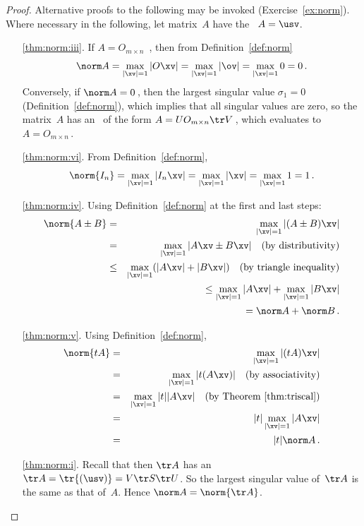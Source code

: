 \begin{proof}  Alternative proofs to the following may be invoked (Exercise~\ref{ex:norm}).
Where necessary in the following, let matrix~\(A\) have the \svd\ \(A=\usv\).
\begin{itemize}
\item[\ref{thm:norm:iii}.]
If \(A=O_{m\times n}\) \,,
then from Definition~\ref{def:norm} 
\begin{equation*}
\norm A=\max_{|\xv|=1}|O\xv|
=\max_{|\xv|=1}|\ov|=\max_{|\xv|=1}0=0\,.
\end{equation*}
Conversely, if \(\norm A=0\)\,, then the largest singular value \(\sigma_1=0\) (Definition~\ref{def:norm}), which implies that all singular values are zero, so the matrix~\(A\) has an \svd\ of the form \(A=UO_{m\times n}\tr V\)\,, which evaluates to \(A=O_{m\times n}\)\,.

\item[\ref{thm:norm:vi}.] From Definition~\ref{def:norm}, 
\begin{equation*}
\norm{I_n}=\max_{|\xv|=1}|I_n\xv|
=\max_{|\xv|=1}|\xv|
=\max_{|\xv|=1}1
=1\,.
\end{equation*}


\item[\ref{thm:norm:iv}.]
Using Definition~\ref{def:norm} at the first and last steps:
\begin{eqnarray*}
\norm{A\pm B}
&=&\max_{|\xv|=1}|(A\pm B)\xv|
\\&=&\max_{|\xv|=1}|A\xv\pm B\xv|
\quad(\text{by distributivity})
\\&\leq&\max_{|\xv|=1}(|A\xv|+ |B\xv|)
\quad(\text{by triangle inequality})
\\&&{}\leq\max_{|\xv|=1}|A\xv|+ \max_{|\xv|=1}|B\xv|
\\&&{}\phantom{\leq}=\norm A+ \norm B\,.
\end{eqnarray*}

\item[\ref{thm:norm:v}.]
Using Definition~\ref{def:norm},
\begin{eqnarray*}
\norm{tA}
&=&\max_{|\xv|=1}|(tA)\xv|
\\&=&\max_{|\xv|=1}|t(A\xv)|
\quad(\text{by associativity})
\\&=&\max_{|\xv|=1}|t||A\xv|
\quad(\text{by Theorem~\ref{thm:triscal}})
\\&=&|t|\max_{|\xv|=1}|A\xv|
\\&=&|t|\norm A\,.
\end{eqnarray*}

\item[\ref{thm:norm:i}.]
Recall that  then \(\tr A\) has an \svd\ \(\tr A=\tr{(\usv)}=V\tr S\tr U\). 
So the largest singular value of~\(\tr A\) is the same as that of~\(A\).
Hence \(\norm A=\norm{\tr A}\).


\end{itemize}
\end{proof}
